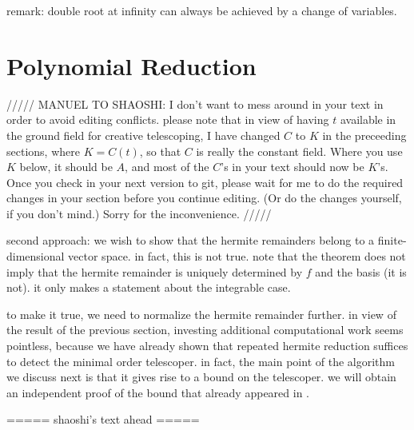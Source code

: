 \documentclass{sig-alternate}
\begin{document}
remark: double root at infinity can always be achieved by a change of variables.

\section{Polynomial Reduction}\label{sec:polynomial}

///// MANUEL TO SHAOSHI: I don't want to mess around in your text in order to avoid
editing conflicts. please note that in view of having $t$ available in the ground
field for creative telescoping, I have changed $C$ to $K$ in the preceeding sections,
where $K=C(t)$, so that $C$ is really the constant field. Where you use $K$ below,
it should be $A$, and most of the $C$'s in your text should now be $K$'s. Once you
check in your next version to git, please wait for me to do the required changes in
your section before you continue editing. (Or do the changes yourself, if you don't
mind.) Sorry for the inconvenience. /////


second approach: we wish to show that the hermite remainders belong to a finite-dimensional
vector space. in fact, this is not true.
note that the theorem does not imply that the hermite remainder is uniquely determined by
$f$ and the basis (it is not). it only makes a statement about the integrable case.

to make it true, we need to normalize the hermite remainder further. in view of the result
of the previous section, investing additional computational work seems pointless, because we have
already shown that repeated hermite reduction suffices to detect the minimal order telescoper.
in fact, the main point of the algorithm we discuss next is that it gives rise to a bound on
the telescoper. we will obtain an independent proof of the bound that already appeared in \cite{chen14a}.

===== shaoshi's text ahead =====
\end{document}
